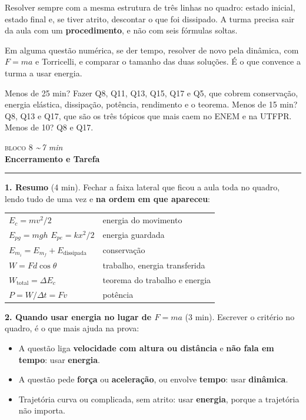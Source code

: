 \documentclass[11pt,a4paper]{article}
\newcommand{\bloco}[3]{%
  \needspace{7\baselineskip}
  \vspace{1.8em}
  {\scshape\color{vinho}bloco #1}\hfill
    {\small\itshape\color{grafite}\textasciitilde\,#3 min}\\[0.1em]
  {\Large\bfseries #2}\\[-0.55em]
  {\color{black!30}\rule{\linewidth}{0.5pt}}
  \par\nobreak\smallskip
}
\begin{document}
\begin{obs}
Resolver sempre com a mesma estrutura de tr\^es linhas no quadro:
estado inicial, estado final e, se tiver atrito, descontar o que foi
dissipado. A turma precisa sair da aula com um \textbf{procedimento},
e n\~ao com seis f\'ormulas soltas.

Em alguma quest\~ao num\'erica, se der tempo, resolver de novo pela
din\^amica, com $F = ma$ e Torricelli, e comparar o tamanho das duas
solu\c{c}\~oes. \'E o que convence a turma a usar energia.
\end{obs}

\begin{corte}
Menos de 25 min? Fazer Q8, Q11, Q13, Q15, Q17 e Q5, que cobrem
conserva\c{c}\~ao, energia el\'astica, dissipa\c{c}\~ao, pot\^encia,
rendimento e o teorema. Menos de 15 min? Q8, Q13 e Q17, que s\~ao os
tr\^es t\'opicos que mais caem no ENEM e na UTFPR. Menos de 10?
Q8 e Q17.
\end{corte}

\bloco{8}{Encerramento e Tarefa}{7}

\begin{quadro}
\textbf{1. Resumo} (4 min). Fechar a faixa lateral que ficou a aula
toda no quadro, lendo tudo de uma vez e \textbf{na ordem em que
apareceu}:
\begin{center}\small
  \begin{tabular}{@{}ll@{}}
    \toprule
    $E_c = mv^2/2$ & energia do movimento \\
    $E_{pg} = mgh$ \quad $E_{pe} = kx^2/2$ & energia guardada \\
    $E_{m_i} = E_{m_f} + E_{\text{dissipada}}$ & conserva\c{c}\~ao \\
    $W = Fd\cos\theta$ & trabalho, energia transferida \\
    $W_{\text{total}} = \Delta E_c$ & teorema do trabalho e energia \\
    $P = W/\Delta t = Fv$ & pot\^encia \\
    \bottomrule
  \end{tabular}
\end{center}

\medskip
\textbf{2. Quando usar energia no lugar de $F = ma$} (3 min).
Escrever o crit\'erio no quadro, \'e o que mais ajuda na prova:
\begin{itemize}[nosep]
  \item A quest\~ao liga \textbf{velocidade com altura ou
        dist\^ancia} e \textbf{n\~ao fala em tempo}: usar
        \textbf{energia}.
  \item A quest\~ao pede \textbf{for\c{c}a} ou
        \textbf{acelera\c{c}\~ao}, ou envolve \textbf{tempo}: usar
        \textbf{din\^amica}.
  \item Trajet\'oria curva ou complicada, sem atrito: usar
        \textbf{energia}, porque a trajet\'oria n\~ao importa.
\end{itemize}
\end{quadro}
\end{document}
